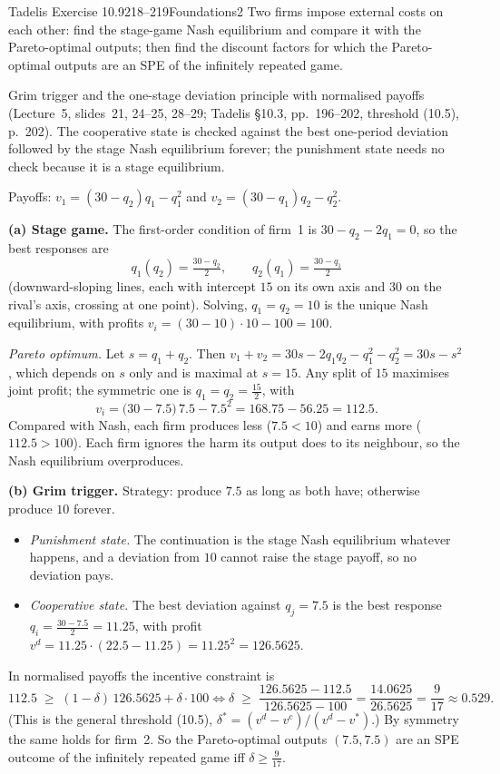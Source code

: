 \begin{exsol}{Tadelis Exercise 10.9}{218--219}{Foundations}{2}
\asked Two firms impose external costs on each other: find the stage-game Nash equilibrium and
compare it with the Pareto-optimal outputs; then find the discount factors for which the Pareto-optimal
outputs are an SPE of the infinitely repeated game.

\method Grim trigger and the one-stage deviation principle with normalised payoffs (Lecture~5,
slides~21, 24--25, 28--29; Tadelis \S10.3, pp.~196--202, threshold (10.5), p.~202). The
cooperative state is checked against the best one-period deviation followed by the stage Nash
equilibrium forever; the punishment state needs no check because it is a stage equilibrium.

\solution
Payoffs: $v_1 = (30 - q_2)q_1 - q_1^2$ and $v_2 = (30 - q_1)q_2 - q_2^2$.

\textbf{(a) Stage game.} The first-order condition of firm~1 is $30 - q_2 - 2q_1 = 0$, so the best
responses are
\[
  q_1(q_2) = \tfrac{30 - q_2}{2}, \qquad q_2(q_1) = \tfrac{30 - q_1}{2}
\]
(downward-sloping lines, each with intercept $15$ on its own axis and $30$ on the rival's axis, crossing at one point). Solving, $q_1 = q_2 = 10$ is the unique Nash equilibrium, with
profits $v_i = (30-10)\cdot10 - 100 = 100$.

\emph{Pareto optimum.} Let $s = q_1 + q_2$. Then
$v_1 + v_2 = 30s - 2q_1q_2 - q_1^2 - q_2^2 = 30s - s^2$, which depends on $s$ only and is maximal at
$s = 15$. Any split of $15$ maximises joint profit; the symmetric one is $q_1 = q_2 = \frac{15}{2}$, with
\[
  v_i = \bigl(30 - 7.5\bigr)\,7.5 - 7.5^2 = 168.75 - 56.25 = 112.5 .
\]
Compared with Nash, each firm produces less ($7.5 < 10$) and earns more ($112.5 > 100$). Each firm
ignores the harm its output does to its neighbour, so the Nash equilibrium overproduces.

\textbf{(b) Grim trigger.} Strategy: produce $7.5$ as long as both have; otherwise produce $10$ forever.
\begin{itemize}
  \item \emph{Punishment state.} The continuation is the stage Nash equilibrium whatever happens, and a
  deviation from $10$ cannot raise the stage payoff, so no deviation pays.
  \item \emph{Cooperative state.} The best deviation against $q_j = 7.5$ is the best response
  $q_i = \frac{30-7.5}{2} = 11.25$, with profit $v^d = 11.25\cdot(22.5 - 11.25) = 11.25^2 = 126.5625$.
\end{itemize}
In normalised payoffs the incentive constraint is
\[
  112.5 \;\ge\; (1-\delta)\,126.5625 + \delta\cdot 100
  \iff \delta \;\ge\; \frac{126.5625 - 112.5}{126.5625 - 100} = \frac{14.0625}{26.5625} = \frac{9}{17}
  \approx 0.529 .
\]
(This is the general threshold (10.5), $\delta^* = (v^d - v^c)/(v^d - v^*)$.) By symmetry the same holds
for firm~2. So the Pareto-optimal outputs $(7.5, 7.5)$ are an SPE outcome of the infinitely repeated
game iff $\delta \ge \frac{9}{17}$.


\end{exsol}
